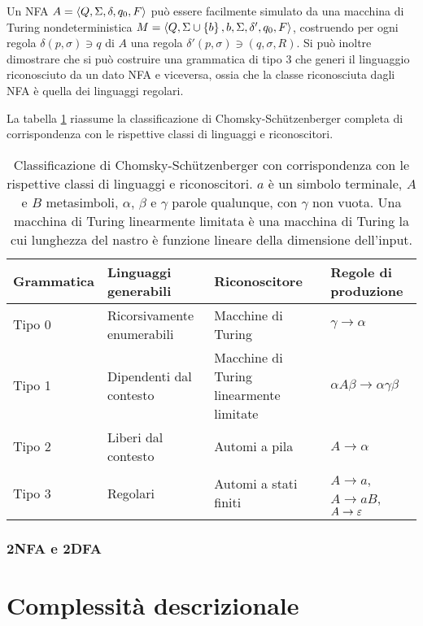 Un NFA $A=\langle Q,\Sigma,\delta,q_0,F \rangle$ può essere facilmente simulato da una macchina di Turing nondeterministica $M=\langle Q,\Sigma\cup\left\{ b \right\},b,\Sigma,\delta',q_0,F \rangle$, costruendo per ogni regola $\delta(p,\sigma)\ni q$ di $A$ una regola $\delta'(p,\sigma)\ni (q,\sigma,R)$. Si può inoltre dimostrare che si può costruire una grammatica di tipo 3 che generi il linguaggio riconosciuto da un dato NFA e viceversa, ossia che la classe riconosciuta dagli NFA è quella dei linguaggi regolari.

La tabella \ref{tab:prel:chomskyhier} riassume la classificazione di Chomsky-Schützenberger completa di corrispondenza con le rispettive classi di linguaggi e riconoscitori.

\begin{table}
	\caption{Classificazione di Chomsky-Schützenberger con corrispondenza con le rispettive classi di linguaggi e riconoscitori. $a$ è un simbolo terminale, $A$ e $B$ metasimboli, $\alpha$, $\beta$ e $\gamma$ parole qualunque, con $\gamma$ non vuota. Una macchina di Turing linearmente limitata è una macchina di Turing la cui lunghezza del nastro è funzione lineare della dimensione dell'input.}
	\label{tab:prel:chomskyhier}
	\centering
	\begin{tabularx}{\textwidth}{lXXl}
		\toprule
		\textbf{Grammatica} & \textbf{Linguaggi generabili} & \textbf{Riconoscitore}                  & \textbf{Regole di produzione}         \\
		\midrule
		Tipo 0              & Ricorsivamente enumerabili    & Macchine di Turing                      & $\gamma\to\alpha$                     \\
		Tipo 1              & Dipendenti dal contesto       & Macchine di Turing linearmente limitate & $\alpha A\beta\to\alpha\gamma\beta$   \\
		Tipo 2              & Liberi dal contesto           & Automi a pila                           & $A\to\alpha$                          \\
		Tipo 3              & Regolari                      & Automi a stati finiti                   & $A\to a$, $A\to aB$, $A\to\varepsilon$ \\
		\bottomrule
	\end{tabularx}
\end{table}

\subsubsection{2NFA e 2DFA}



\section{Complessità descrizionale}
